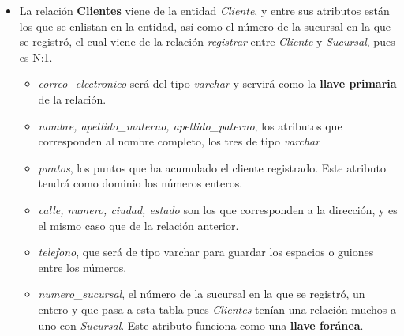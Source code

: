 \documentclass[11pt]{article}
\begin{document}
\begin{itemize}
\item La relación \textbf{Clientes} viene de la entidad \textit{Cliente}, y entre sus atributos están los que se enlistan en la entidad, así como el número de la sucursal en la que se registró, el cual viene de la relación \textit{registrar} entre \textit{Cliente} y \textit{Sucursal}, pues es N:1.
    \begin{itemize}
    \item \textit{correo\_electronico} será del tipo \textit{varchar} y servirá como la \textbf{llave primaria} de la relación.
    \item \textit{nombre, apellido\_materno, apellido\_paterno}, los atributos que corresponden al nombre completo, los tres de tipo \textit{varchar}
    \item \textit{puntos}, los puntos que ha acumulado el cliente registrado. Este atributo tendrá como dominio los números enteros.
    \item \textit{calle, numero, ciudad, estado} son los que corresponden a la dirección, y es el mismo caso que de la relación anterior.
    \item \textit{telefono}, que será de tipo varchar para guardar los espacios o guiones entre los números.
    \item \textit{numero\_sucursal}, el número de la sucursal en la que se registró, un entero y que pasa a esta tabla pues \textit{Clientes} tenían una relación muchos a uno con \textit{Sucursal}. Este atributo funciona como una \textbf{llave foránea}.
    \end{itemize}


\end{itemize}
\end{document}
